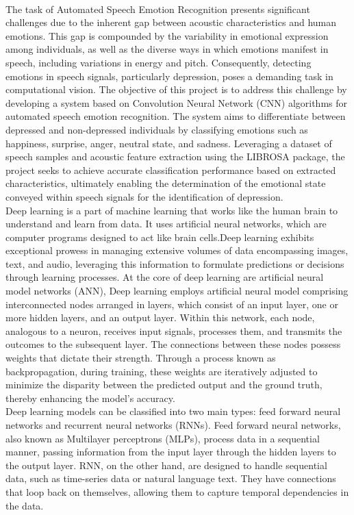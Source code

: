 \\
The task of Automated Speech Emotion Recognition presents significant challenges due to the inherent gap between acoustic characteristics and human emotions. This gap is compounded by the variability in emotional expression among individuals, as well as the diverse ways in which emotions manifest in speech, including variations in energy and pitch. Consequently, detecting emotions in speech signals, particularly depression, poses a demanding task in computational vision. The objective of this project is to address this challenge by developing a system based on Convolution Neural Network (CNN) algorithms for automated speech emotion recognition. The system aims to differentiate between depressed and non-depressed individuals by classifying emotions such as happiness, surprise, anger, neutral state, and sadness. Leveraging a dataset of speech samples and acoustic feature extraction using the LIBROSA package, the project seeks to achieve accurate classification performance based on extracted characteristics, ultimately enabling the determination of the emotional state conveyed within speech signals for the identification of depression.
\\
Deep learning is a part of machine learning that works like the human brain to understand and learn from data. It uses artificial neural networks, which are computer programs designed to act like brain cells.Deep learning exhibits exceptional prowess in managing extensive volumes of data encompassing images, text, and audio, leveraging this information to formulate predictions or decisions through learning processes.
At the core of deep learning are artificial neural model networks \cite{wu2018development} (ANN), Deep learning employs artificial neural model comprising interconnected nodes arranged in layers, which consist of an input layer, one or more hidden layers, and an output layer. Within this network, each node, analogous to a neuron, receives input signals, processes them, and transmits the outcomes to the subsequent layer. The connections between these nodes possess weights that dictate their strength. Through a process known as backpropagation, during training, these weights are iteratively adjusted to minimize the disparity between the predicted output and the ground truth, thereby enhancing the model's accuracy.
\\
Deep learning models can be classified into two main types: feed forward neural networks and recurrent neural networks\cite{wang2022predrnn} (RNNs). Feed forward neural networks, also known as Multilayer perceptrons (MLPs), process data in a sequential manner, passing information from the input layer through the hidden layers to the output layer. RNN, on the other hand, are designed to handle sequential data, such as time-series data or natural language text. They have connections that loop back on themselves, allowing them to capture temporal dependencies in the data.
